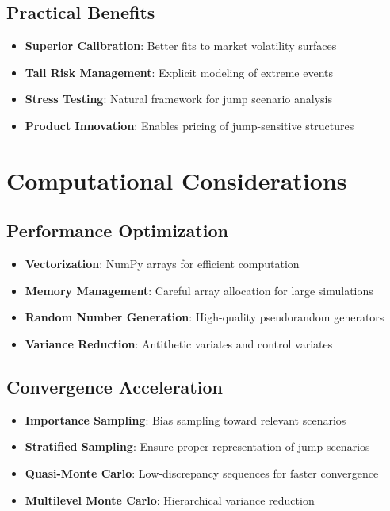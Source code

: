 \documentclass[12pt,a4paper]{article}
\begin{document}
\subsection{Practical Benefits}

\begin{itemize}
    \item \textbf{Superior Calibration}: Better fits to market volatility surfaces
    \item \textbf{Tail Risk Management}: Explicit modeling of extreme events
    \item \textbf{Stress Testing}: Natural framework for jump scenario analysis
    \item \textbf{Product Innovation}: Enables pricing of jump-sensitive structures
\end{itemize}

\section{Computational Considerations}

\subsection{Performance Optimization}

\begin{itemize}
    \item \textbf{Vectorization}: NumPy arrays for efficient computation
    \item \textbf{Memory Management}: Careful array allocation for large simulations
    \item \textbf{Random Number Generation}: High-quality pseudorandom generators
    \item \textbf{Variance Reduction}: Antithetic variates and control variates
\end{itemize}

\subsection{Convergence Acceleration}

\begin{itemize}
    \item \textbf{Importance Sampling}: Bias sampling toward relevant scenarios
    \item \textbf{Stratified Sampling}: Ensure proper representation of jump scenarios
    \item \textbf{Quasi-Monte Carlo}: Low-discrepancy sequences for faster convergence
    \item \textbf{Multilevel Monte Carlo}: Hierarchical variance reduction
\end{itemize}
\end{document}
